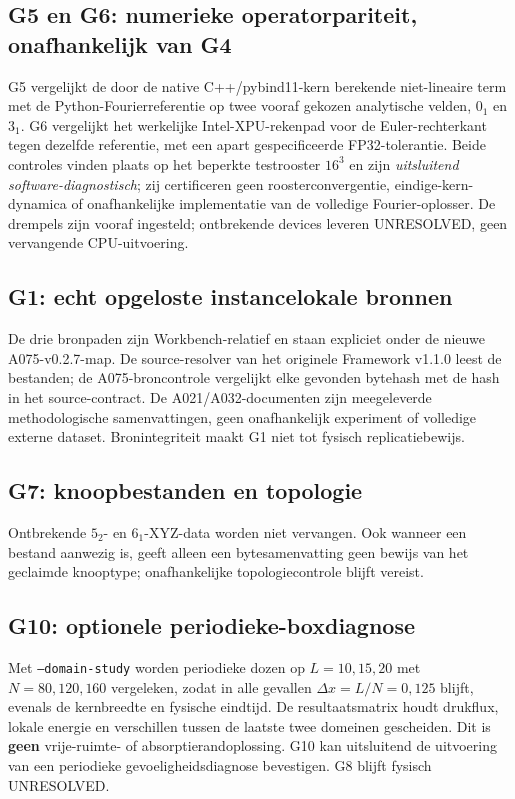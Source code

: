 \documentclass[10pt,a4paper]{article}
\begin{document}
\subsection{G5 en G6: numerieke operatorpariteit, onafhankelijk van G4}
G5 vergelijkt de door de native C++/pybind11-kern berekende niet-lineaire term
met de Python-Fourierreferentie op twee vooraf gekozen analytische velden,
$0_1$ en $3_1$. G6 vergelijkt het werkelijke Intel-XPU-rekenpad voor de
Euler-rechterkant tegen dezelfde referentie, met een apart gespecificeerde
FP32-tolerantie. Beide controles vinden plaats op het beperkte testrooster
$16^3$ en zijn \emph{uitsluitend software-diagnostisch}; zij certificeren geen
roosterconvergentie, eindige-kern-dynamica of onafhankelijke implementatie
van de volledige Fourier-oplosser. De drempels zijn vooraf ingesteld;
ontbrekende devices leveren UNRESOLVED, geen vervangende CPU-uitvoering.
\subsection{G1: echt opgeloste instancelokale bronnen}
De drie bronpaden zijn Workbench-relatief en staan expliciet onder de nieuwe
A075-v0.2.7-map. De source-resolver van het originele Framework v1.1.0 leest
de bestanden; de A075-broncontrole vergelijkt elke gevonden bytehash met
de hash in het source-contract. De A021/A032-documenten zijn meegeleverde
methodologische samenvattingen, geen onafhankelijk experiment of volledige
externe dataset. Bronintegriteit maakt G1 niet tot fysisch replicatiebewijs.
\subsection{G7: knoopbestanden en topologie}
Ontbrekende $5_2$- en $6_1$-XYZ-data worden niet vervangen. Ook wanneer een
bestand aanwezig is, geeft alleen een bytesamenvatting geen bewijs van het
geclaimde knooptype; onafhankelijke topologiecontrole blijft vereist.
\subsection{G10: optionele periodieke-boxdiagnose}
Met \texttt{--domain-study} worden periodieke dozen op $L=10,15,20$
met $N=80,120,160$ vergeleken, zodat in alle gevallen
$\Delta x=L/N=0{,}125$ blijft, evenals de kernbreedte en fysische eindtijd.
De resultaatsmatrix houdt drukflux, lokale energie en verschillen tussen
de laatste twee domeinen gescheiden. Dit is \textbf{geen} vrije-ruimte-
of absorptierandoplossing. G10 kan uitsluitend de uitvoering van een
periodieke gevoeligheidsdiagnose bevestigen. G8 blijft fysisch UNRESOLVED.
\end{document}
